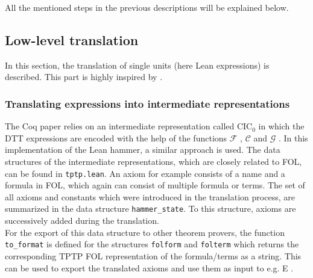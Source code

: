 \documentclass[a4paper]{article}
\newcommand{\F}[0]{$\mathcal{F}$ }
\newcommand{\G}[0]{$\mathcal{G}$ }
\newcommand{\C}[0]{$\mathcal{C}$ }
\begin{document}
All the mentioned steps in the previous descriptions will be explained below.

\subsection{Low-level translation}

In this section, the translation of single units (here Lean expressions) is described. This part is highly inspired by \cite{CoqHammer}.

\subsubsection{Translating expressions into intermediate representations}
\label{sec:term_translation}
The Coq paper relies on an intermediate representation called $\text{CIC}_0$ in which the DTT expressions are encoded with the help of the functions \F, \C and \G. In this implementation of the Lean hammer, a similar approach is used. The data structures of the intermediate representations, which are closely related to FOL, can be found in \texttt{tptp.lean}. An axiom for example consists of a name and a formula in FOL, which again can consist of multiple formula or terms. The set of all axioms and constants which were introduced in the translation process, are summarized in the data structure \texttt{hammer\_state}. To this structure, axioms are successively added during the translation.\\
For the export of this data structure to other theorem provers, the function \texttt{to\_format} is defined for the structures \texttt{folform} and \texttt{folterm} which returns the corresponding TPTP FOL representation of the formula/terms as a string. This can be used to export the translated axioms and use them as input to e.g. E \cite{EProver}.\\
\end{document}
